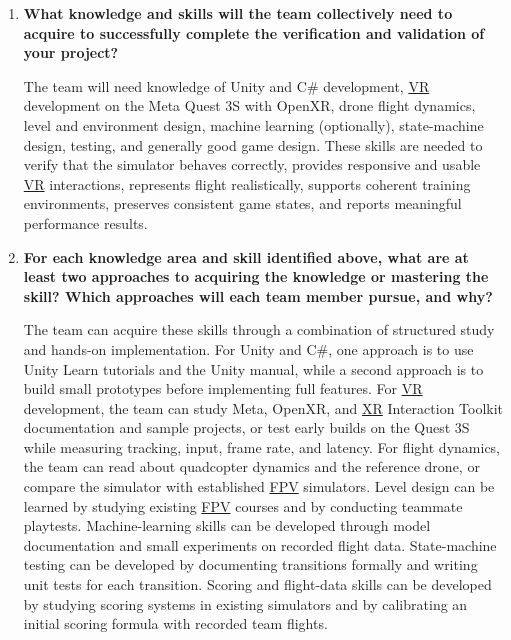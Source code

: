 \documentclass[12pt, titlepage]{article}
\begin{document}
\begin{enumerate}
    \item \textbf{What knowledge and skills will the team collectively need to acquire to successfully complete the verification and validation of your project?}

    The team will need knowledge of Unity and C\# development, \hyperlink{abbr:VR}{VR} development on the Meta Quest 3S with OpenXR, drone flight dynamics, level and environment design, machine learning (optionally), state-machine design, testing, and generally good game design. These skills are needed to verify that the simulator behaves correctly, provides responsive and usable \hyperlink{abbr:VR}{VR} interactions, represents flight realistically, supports coherent training environments, preserves consistent game states, and reports meaningful performance results.

    \item \textbf{For each knowledge area and skill identified above, what are at least two approaches to acquiring the knowledge or mastering the skill? Which approaches will each team member pursue, and why?}

    The team can acquire these skills through a combination of structured study and hands-on implementation. For Unity and C\#, one approach is to use Unity Learn tutorials and the Unity manual, while a second approach is to build small prototypes before implementing full features. For \hyperlink{abbr:VR}{VR} development, the team can study Meta, OpenXR, and \hyperlink{abbr:XR}{XR} Interaction Toolkit documentation and sample projects, or test early builds on the Quest 3S while measuring tracking, input, frame rate, and latency. For flight dynamics, the team can read about quadcopter dynamics and the reference drone, or compare the simulator with established \hyperlink{abbr:FPV}{FPV} simulators. Level design can be learned by studying existing \hyperlink{abbr:FPV}{FPV} courses and by conducting teammate playtests. Machine-learning skills can be developed through model documentation and small experiments on recorded flight data. State-machine testing can be developed by documenting transitions formally and writing unit tests for each transition. Scoring and flight-data skills can be developed by studying scoring systems in existing simulators and by calibrating an initial scoring formula with recorded team flights.


\end{enumerate}
\end{document}
